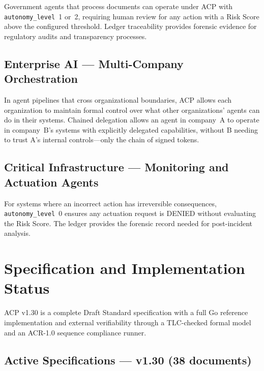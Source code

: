 \documentclass[11pt]{article}
\theoremstyle{definition}
\begin{document}
Government agents that process documents can operate under ACP with \texttt{autonomy\_level}~1 or~2,
requiring human review for any action with a Risk Score above the configured threshold.
Ledger traceability provides forensic evidence for regulatory audits and transparency processes.

\subsection{Enterprise AI --- Multi-Company Orchestration}

In agent pipelines that cross organizational boundaries,
ACP allows each organization to maintain formal control over what other organizations' agents can do in their systems.
Chained delegation allows an agent in company~A to operate in company~B's systems with explicitly delegated capabilities,
without B needing to trust A's internal controls---only the chain of signed tokens.

\subsection{Critical Infrastructure --- Monitoring and Actuation Agents}

For systems where an incorrect action has irreversible consequences,
\texttt{autonomy\_level}~0 ensures any actuation request is DENIED without evaluating the Risk Score.
The ledger provides the forensic record needed for post-incident analysis.

\section{Specification and Implementation Status}

ACP v1.30 is a complete Draft Standard specification with a full Go reference implementation
and external verifiability through a TLC-checked formal model and an ACR-1.0 sequence compliance runner.

\subsection{Active Specifications --- v1.30 (38 documents)}
\end{document}
